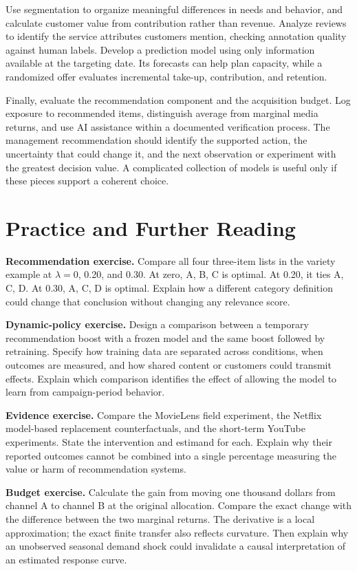 Use segmentation to organize meaningful differences in needs and
behavior, and calculate customer value from contribution rather than
revenue. Analyze reviews to identify the service attributes customers
mention, checking annotation quality against human labels. Develop a
prediction model using only information available at the targeting date.
Its forecasts can help plan capacity, while a randomized offer evaluates
incremental take-up, contribution, and retention.

Finally, evaluate the recommendation component and the acquisition
budget. Log exposure to recommended items, distinguish average from
marginal media returns, and use AI assistance within a documented
verification process. The management recommendation should identify the
supported action, the uncertainty that could change it, and the next
observation or experiment with the greatest decision value. A
complicated collection of models is useful only if these pieces support
a coherent choice.

\hypertarget{M08-practice-and-further-reading}{%
\section{Practice and Further
Reading}\label{M08-practice-and-further-reading}}

\noindent \textbf{Recommendation exercise.} Compare all four three-item lists in
the variety example at \(\lambda=0\), 0.20, and 0.30. At zero, A, B, C
is optimal. At 0.20, it ties A, C, D. At 0.30, A, C, D is optimal.
Explain how a different category definition could change that conclusion
without changing any relevance score.

\textbf{Dynamic-policy exercise.} Design a comparison between a
temporary recommendation boost with a frozen model and the same boost
followed by retraining. Specify how training data are separated across
conditions, when outcomes are measured, and how shared content or
customers could transmit effects. Explain which comparison identifies
the effect of allowing the model to learn from campaign-period behavior.

\textbf{Evidence exercise.} Compare the MovieLens field experiment, the
Netflix model-based replacement counterfactuals, and the short-term
YouTube experiments. State the intervention and estimand for each.
Explain why their reported outcomes cannot be combined into a single
percentage measuring the value or harm of recommendation systems.

\textbf{Budget exercise.} Calculate the gain from moving one thousand
dollars from channel A to channel B at the original allocation. Compare
the exact change with the difference between the two marginal returns.
The derivative is a local approximation; the exact finite transfer also
reflects curvature. Then explain why an unobserved seasonal demand shock
could invalidate a causal interpretation of an estimated response curve.

